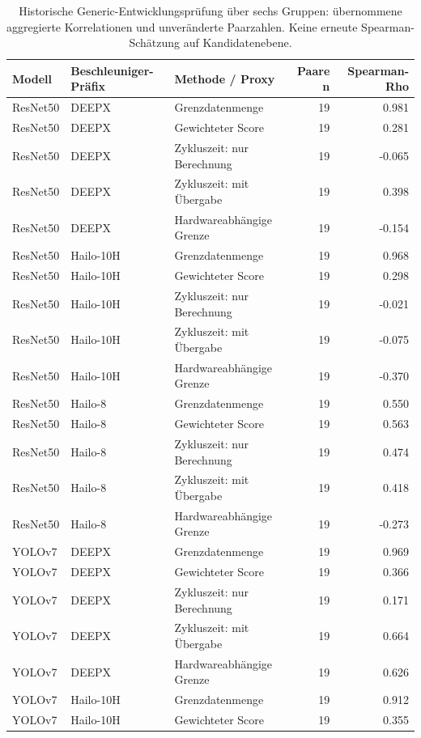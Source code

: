 \begin{longtable}{@{}llp{5.3cm}rr@{}}
\caption{Historische Generic-Entwicklungsprüfung über sechs Gruppen: übernommene aggregierte Korrelationen und unveränderte Paarzahlen. Keine erneute Spearman-Schätzung auf Kandidatenebene.}\\
\toprule
Modell & Beschleuniger-Präfix & Methode / Proxy & Paare n & Spearman-Rho \\
\midrule\endhead
ResNet50 & DEEPX & Grenzdatenmenge & 19 & 0.981 \\
ResNet50 & DEEPX & Gewichteter Score & 19 & 0.281 \\
ResNet50 & DEEPX & Zykluszeit: nur Berechnung & 19 & -0.065 \\
ResNet50 & DEEPX & Zykluszeit: mit Übergabe & 19 & 0.398 \\
ResNet50 & DEEPX & Hardwareabhängige Grenze & 19 & -0.154 \\
ResNet50 & Hailo-10H & Grenzdatenmenge & 19 & 0.968 \\
ResNet50 & Hailo-10H & Gewichteter Score & 19 & 0.298 \\
ResNet50 & Hailo-10H & Zykluszeit: nur Berechnung & 19 & -0.021 \\
ResNet50 & Hailo-10H & Zykluszeit: mit Übergabe & 19 & -0.075 \\
ResNet50 & Hailo-10H & Hardwareabhängige Grenze & 19 & -0.370 \\
ResNet50 & Hailo-8 & Grenzdatenmenge & 19 & 0.550 \\
ResNet50 & Hailo-8 & Gewichteter Score & 19 & 0.563 \\
ResNet50 & Hailo-8 & Zykluszeit: nur Berechnung & 19 & 0.474 \\
ResNet50 & Hailo-8 & Zykluszeit: mit Übergabe & 19 & 0.418 \\
ResNet50 & Hailo-8 & Hardwareabhängige Grenze & 19 & -0.273 \\
YOLOv7 & DEEPX & Grenzdatenmenge & 19 & 0.969 \\
YOLOv7 & DEEPX & Gewichteter Score & 19 & 0.366 \\
YOLOv7 & DEEPX & Zykluszeit: nur Berechnung & 19 & 0.171 \\
YOLOv7 & DEEPX & Zykluszeit: mit Übergabe & 19 & 0.664 \\
YOLOv7 & DEEPX & Hardwareabhängige Grenze & 19 & 0.626 \\
YOLOv7 & Hailo-10H & Grenzdatenmenge & 19 & 0.912 \\
YOLOv7 & Hailo-10H & Gewichteter Score & 19 & 0.355 \\

\end{longtable}
